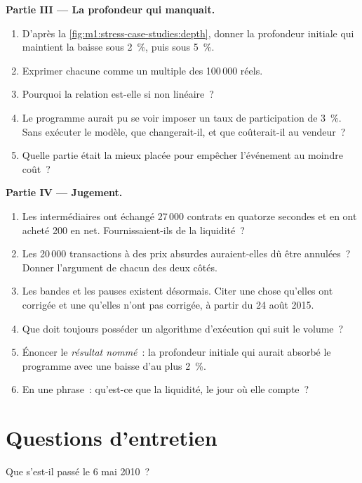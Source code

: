 \begin{problem}
\medskip\noindent\textbf{Partie III --- La profondeur qui manquait.}
\begin{enumerate}[resume]
\item D'après la \cref{fig:m1:stress-case-studies:depth}, donner la profondeur initiale qui maintient la baisse
sous 2~\%, puis sous 5~\%.
\item Exprimer chacune comme un multiple des 100\,000 réels.
\item Pourquoi la relation est-elle si non linéaire~?
\item Le programme aurait pu se voir imposer un taux de participation
de 3~\%. Sans exécuter le modèle, que changerait-il, et que coûterait-il
au vendeur~?
\item Quelle partie était la mieux placée pour empêcher l'événement au moindre coût~?
\end{enumerate}

\medskip\noindent\textbf{Partie IV --- Jugement.}
\begin{enumerate}[resume]
\item Les intermédiaires ont échangé 27\,000 contrats en quatorze secondes et en ont acheté 200 en net.
Fournissaient-ils de la liquidité~?
\item Les 20\,000 transactions à des prix absurdes auraient-elles dû être annulées~? Donner
l'argument de chacun des deux côtés.
\item Les bandes et les pauses existent désormais. Citer une chose qu'elles ont corrigée et une qu'elles n'ont pas corrigée,
à partir du 24 août 2015.
\item Que doit toujours posséder un algorithme d'exécution qui suit le volume~?
\item Énoncer le \emph{résultat nommé}~: la profondeur initiale qui aurait absorbé
le programme avec une baisse d'au plus 2~\%.
\item En une phrase~: qu'est-ce que la liquidité, le jour où elle compte~?
\end{enumerate}
\end{problem}

\section{Questions d'entretien}

\begin{interviewq}\label{iq:m1:stress-case-studies:1}
Que s'est-il passé le 6 mai 2010~?
\end{interviewq}

